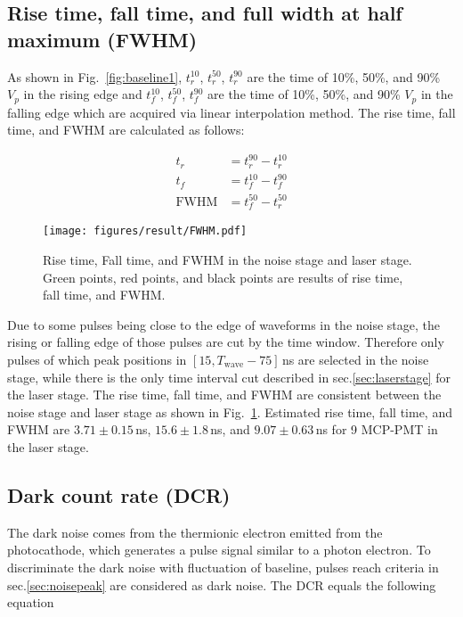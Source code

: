 \subsection{Rise time, fall time, and full width at half maximum (FWHM)}
As shown in Fig.~\ref{fig:baseline1}, $t^{10}_r$, $t^{50}_r$, $t^{90}_r$ are the time of 10\%, 50\%, and 90\% $V_p$ in the rising edge and $t^{10}_f$, $t^{50}_f$, $t^{90}_f$ are the time of 10\%, 50\%, and 90\% $V_p$ in the falling edge which are acquired via linear interpolation method. The rise time, fall time, and FWHM are calculated as follows:

\begin{align}
    t_r &= t^{90}_r - t^{10}_r\\
    t_f &= t^{10}_f - t^{90}_f\\
    \mathrm{FWHM} &= t^{50}_f - t^{50}_r
\end{align}
\begin{figure}[!htbp]
    \centering
    \texttt{[image: figures/result/FWHM.pdf]}
    \caption{Rise time, Fall time, and FWHM in the noise stage and laser stage. Green points, red points, and black points are results of rise time, fall time, and FWHM.}
    \label{fig:RiseCompare}
\end{figure}
Due to some pulses being close to the edge of waveforms in the noise stage, the rising or falling edge of those pulses are cut by the time window. Therefore only pulses of which peak positions in $[15, T_{\mathrm{wave}}-75]$\,ns are selected in the noise stage, while there is the only time interval cut described in sec.\ref{sec:laserstage} for the laser stage.
 The rise time, fall time, and FWHM are consistent between the noise stage and laser stage as shown in Fig.~\ref{fig:RiseCompare}. Estimated rise time, fall time, and FWHM are $3.71\pm0.15$\,ns, $15.6\pm1.8$\,ns, and $9.07\pm0.63$\,ns for 9 MCP-PMT in the laser stage.

\subsection{Dark count rate (DCR)}
The dark noise comes from the thermionic electron emitted from the photocathode, which generates a pulse signal similar to a photon electron. To discriminate the dark noise with fluctuation of baseline, pulses reach criteria in sec.\ref{sec:noisepeak} are considered as dark noise. The DCR equals the following equation

